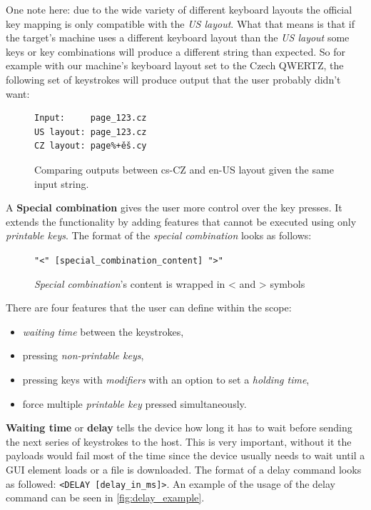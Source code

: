 One note here: due to the wide variety of different keyboard layouts the official key mapping is only compatible with the \emph{US layout}. What that means is that if the target's machine uses a different keyboard layout than the \emph{US layout} some keys or key combinations will produce a different string than expected. So for example with our machine's keyboard layout set to the Czech QWERTZ, the following set of keystrokes will produce output that the user probably didn't want:
\begin{figure}[ht]
\label{fig:layout_comparison}
\centering
\begin{varwidth}{\linewidth}
\begin{verbatim}
Input:     page_123.cz
US layout: page_123.cz
CZ layout: page%+ěš.cy
\end{verbatim}
\end{varwidth}
\caption{Comparing outputs between cs-CZ and en-US layout given the same input string.}
\end{figure}

A \textbf{Special combination} gives the user more control over the key presses. It extends the functionality by adding features that cannot be executed using only \emph{printable keys}. The format of the \emph{special combination} looks as follows:

\begin{figure}[ht]
\label{fig:format_special}
\centering
\begin{varwidth}{\linewidth}
\verb|"<" [special_combination_content] ">"|
\end{varwidth}
\caption{\emph{Special combination}'s content is wrapped in < and > symbols}
\end{figure}

There are four features that the user can define within the scope:
\begin{itemize}
    \item \emph{waiting time} between the keystrokes,
    \item pressing \emph{non-printable keys},
    \item pressing keys with \emph{modifiers} with an option to set a \emph{holding time},
    \item force multiple \emph{printable key} pressed simultaneously.
\end{itemize}

\textbf{Waiting time} or \textbf{delay} tells the device how long it has to wait before sending the next series of keystrokes to the host. This is very important, without it the payloads would fail most of the time since the device usually needs to wait until a GUI element loads or a file is downloaded. The format of a delay command looks as followed: \verb|<DELAY [delay_in_ms]>|. An example of the usage of the delay command can be seen in \autoref{fig:delay_example}.

